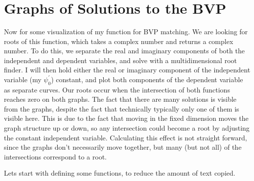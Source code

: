 \documentclass[11pt]{article}
\begin{document}
    \begin{center}
    \end{center}
    { \hspace*{\fill} \\}
    
    \begin{center}
    \end{center}
    { \hspace*{\fill} \\}
    
    \begin{center}
    \end{center}
    { \hspace*{\fill} \\}
    
    \hypertarget{graphs-of-solutions-to-the-bvp}{%
\section{Graphs of Solutions to the
BVP}\label{graphs-of-solutions-to-the-bvp}}

    Now for some visualization of my function for BVP matching. We are
looking for roots of this function, which takes a complex number and
returns a complex number. To do this, we separate the real and imaginary
components of both the independent and dependent variables, and solve
with a multidimensional root finder. I will then hold either the real or
imaginary component of the independent variable (my \(\psi^\prime_0\))
constant, and plot both components of the dependent variable as separate
curves. Our roots occur when the intersection of both functions reaches
zero on both graphs. The fact that there are many solutions is visible
from the graphs, despite the fact that technically typically only one of
them is visible here. This is due to the fact that moving in the fixed
dimension moves the graph structure up or down, so any intersection
could become a root by adjusting the constant independent variable.
Calculating this effect is not straight forward, since the graphs don't
necessarily move together, but many (but not all) of the intersections
correspond to a root.

    Lets start with defining some functions, to reduce the amount of text
copied.
\end{document}
